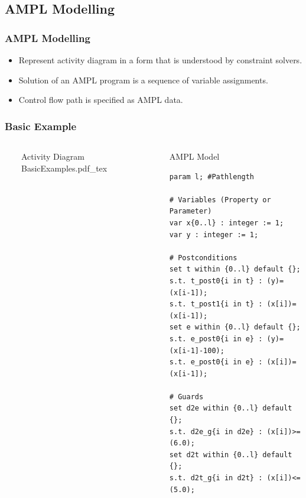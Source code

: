 \documentclass{beamer}
\begin{document}
\subsection{AMPL Modelling}
\begin{frame}
\frametitle{AMPL Modelling \cite{AMPL}}
\begin{itemize}
  \item Represent activity diagram in a form that is understood by constraint solvers.
  \item Solution of an AMPL program is a sequence of variable assignments.
  \item Control flow path is specified as AMPL data.
\end{itemize}
\end{frame}

\begin{frame}[fragile]
\frametitle{Basic Example}
\begin{columns}
  \ 
	\begin{block}{Activity Diagram} 
	\def\svgwidth{\textwidth}
	\scriptsize
	{BasicExamples.pdf_tex}
	\end{block} 
\column{.56\textwidth} \ 
	\begin{block}{AMPL Model} 
		\begin{lstlisting}[basicstyle=\ttfamily\scriptsize,language=ampl]
param l; #Pathlength

# Variables (Property or Parameter)
var x{0..l} : integer := 1;
var y : integer := 1;

# Postconditions
set t within {0..l} default {};
s.t. t_post0{i in t} : (y)=(x[i-1]);
s.t. t_post1{i in t} : (x[i])=(x[i-1]);
set e within {0..l} default {};
s.t. e_post0{i in e} : (y)=(x[i-1]-100);
s.t. e_post0{i in e} : (x[i])=(x[i-1]);

# Guards
set d2e within {0..l} default {};
s.t. d2e_g{i in d2e} : (x[i])>=(6.0);
set d2t within {0..l} default {};
s.t. d2t_g{i in d2t} : (x[i])<=(5.0);
\end{lstlisting}
	\end{block} 
\end{columns}
\end{frame}

\end{document}
